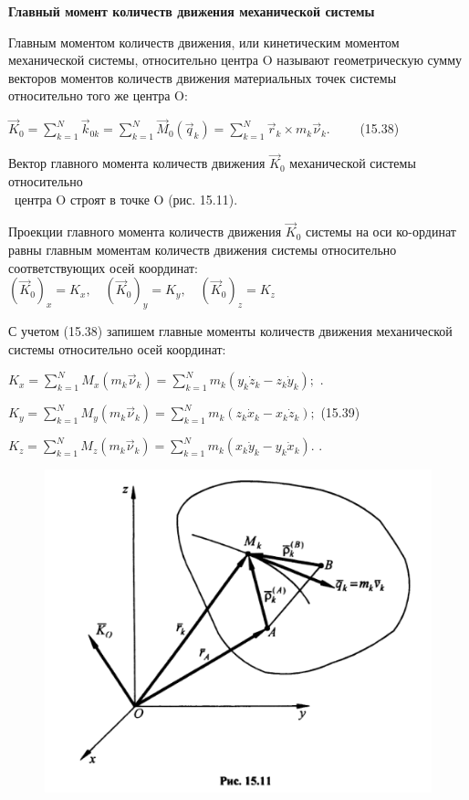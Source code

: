 {\begin{center}
    \pat \textbf{Главный момент количеств движения механической системы}

    \par Главным моментом количеств движения, или кинетическим моментом механической системы, относительно центра O называют геометрическую сумму векторов моментов количеств движения материальных точек системы относительно того же центра O:

    \par $\vec{K}_0=\sum\limits_{k=1}^N \vec{k}_{0k}=\sum\limits_{k=1}^N \vec{M}_0(\vec{q}_k)=
    \sum\limits_{k=1}^N \vec{r}_k\times m_k\vec{\nu}_k. \qquad$ (15.38)

    \par Вектор главного момента количеств движения  $\vec{K}_0$ механической системы относительно \\\ центра O строят в точке O (рис. 15.11).

    \par Проекции главного момента количеств движения  $\vec{K}_0$ системы на оси ко-ординат равны главным моментам количеств движения системы относительно соответствующих осей координат: $(\vec{K}_0)_x=K_x,\quad (\vec{K}_0)_y=K_y,\quad (\vec{K}_0)_z=K_z$

    \par С учетом (15.38) запишем главные моменты количеств движения механической системы относительно осей координат:

    \par $K_x=\sum\limits_{k=1}^N M_x(m_k \vec{\nu}_k) = 
    \sum\limits_{k=1}^N m_k(y_k \dot{z}_k - z_k \dot{y}_k);$ \qquad\qquad\quad .
    \par $K_y=\sum\limits_{k=1}^N M_y(m_k \vec{\nu}_k) = 
    \sum\limits_{k=1}^N m_k(z_k \dot{x}_k - x_k \dot{z}_k);$
    \qquad (15.39)
    \par $K_z=\sum\limits_{k=1}^N M_z(m_k \vec{\nu}_k) = 
    \sum\limits_{k=1}^N m_k(x_k \dot{y}_k - y_k \dot{x}_k).$
    \qquad\qquad\quad .

    \par \begin{figure}[H]
    \centering \includegraphics[scale = 0.5]{img/15.11.jpeg}
    \end{figure}


\end{center}}
